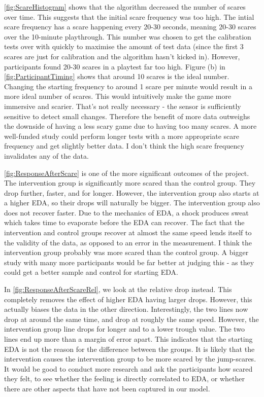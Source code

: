 \documentclass[12pt,a4paper]{article}\usepackage[]{graphicx}\usepackage[]{color}
\begin{document}
\vref{fig:ScareHistogram} shows that the algorithm decreased the number of scares over time.
This suggests that the initial scare frequency was too high.
The intial scare frequency has a scare happening every 20-30 seconds, meaning 20-30 scares over the 10-minute playthrough.
This number was chosen to get the calibration tests over with quickly to maximise the amount of test data (since the first 3 scares are just for calibration and the algorithm hasn't kicked in).
However, participants found 20-30 scares in a playtest far too high.
Figure (b) in \cref{fig:ParticipantTiming} shows that around 10 scares is the ideal number.
Changing the starting frequency to around 1 scare per minute would result in a more ideal number of scares.
This would intuitively make the game more immersive and scarier.
That's not really necessary - the sensor is sufficiently sensitive to detect small changes.
Therefore the benefit of more data outweighs the downside of having a less scary game due to having too many scares.
A more well-funded study could perform longer tests with a more appropriate scare frequency and get slightly better data.
I don't think the high scare frequency invalidates any of the data.

\vref{fig:ResponseAfterScare} is one of the more significant outcomes of the project.
The intervention group is significantly more scared than the control group.
They drop further, faster, and for longer.
However, the intervention group also starts at a higher EDA, so their drops will naturally be bigger.
The intervention group also does not recover faster.
Due to the mechanics of EDA, a shock produces sweat which takes time to evaporate before the EDA can recover.
The fact that the intervention and control groups recover at almost the same speed lends itself to the validity of the data, as opposed to an error in the measurement.
I think the intervention group probably was more scared than the control group.
A bigger study with many more participants would be far better at judging this - as they could get a better sample and control for starting EDA.

In \vref{fig:ResponseAfterScareRel}, we look at the relative drop instead. This completely removes the effect of higher EDA having larger drops. However, this actually biases the data in the other direction.
Interestingly, the two lines now drop at around the same time, and drop at roughly the same speed.
However, the intervention group line drops for longer and to a lower trough value.
The two lines end up more than a margin of error apart.
This indicates that the starting EDA is not the reason for the difference between the groups.
It is likely that the intervention causes the intervention group to be more scared by the jump-scares.
It would be good to conduct more research and ask the participants how scared they felt, to see whether the feeling is directly correlated to EDA, or whether there are other aspects that have not been captured in our model.
\end{document}
